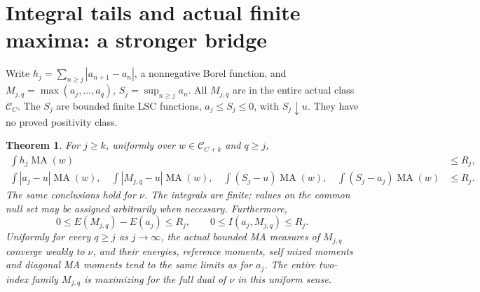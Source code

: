 \documentclass[11pt]{article}
\newtheorem{theorem}{Theorem}
\newcommand{\MA}{\operatorname{MA}}
\newcommand{\C}{\mathcal C}
\begin{document}
\section{Integral tails and actual finite maxima: a stronger bridge}
Write $h_j=\sum_{n\ge j}|a_{n+1}-a_n|$, a nonnegative Borel function,
and $M_{j,q}=\max(a_j,\ldots,a_q)$, $S_j=\sup_{n\ge j}a_n$.
All $M_{j,q}$ are in the entire actual class $\C_C$. The $S_j$ are
bounded finite LSC functions, $a_j\le S_j\le0$, with $S_j\downarrow u$.
They have no proved positivity class.

\begin{theorem}\label{new:tails}
For $j\ge k$, uniformly over $w\in\C_{C+k}$ and $q\ge j$,
\begin{align}
 \int h_j\MA(w)&\le R_j,\label{new:variation}\\
 \int|a_j-u|\MA(w),\quad\int|M_{j,q}-u|\MA(w),\quad
 \int(S_j-u)\MA(w),\quad\int(S_j-a_j)\MA(w)&\le R_j.
 \label{new:alltails}
\end{align}
The same conclusions hold for $\nu$. The integrals are finite; values
on the common null set may be assigned arbitrarily when necessary.
Furthermore,
\begin{equation}\label{new:maximum}
 0\le E(M_{j,q})-E(a_j)\le R_j,
 \qquad 0\le I(a_j,M_{j,q})\le R_j.
\end{equation}
Uniformly for every $q\ge j$ as $j\to\infty$, the actual bounded
MA measures of $M_{j,q}$ converge weakly to $\nu$, and their energies,
reference moments, self mixed moments and diagonal MA moments tend to
the same limits as for $a_j$. The entire two-index family $M_{j,q}$
is maximizing for the full dual of $\nu$ in this uniform sense.
\end{theorem}
\end{document}
